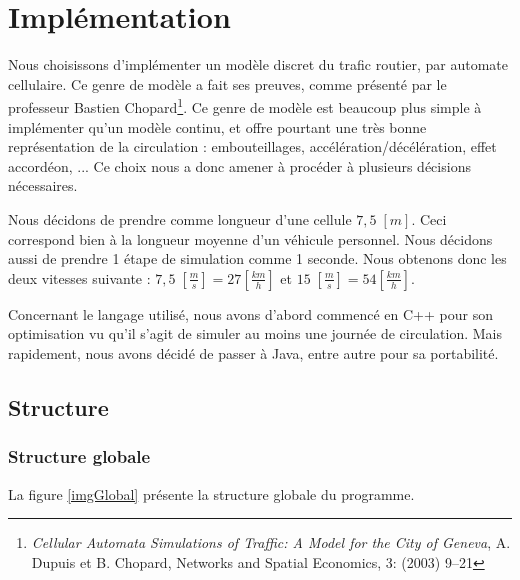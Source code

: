 \documentclass[a4paper,11pt, titlepage]{extarticle}
\begin{document}
\newpage

\section{Implémentation}

Nous choisissons d'implémenter un modèle discret du trafic routier, par automate cellulaire. Ce genre de modèle a fait ses preuves, comme présenté par le professeur Bastien Chopard\footnote{\emph{Cellular Automata Simulations of Traffic:
A Model for the City of Geneva}, A. Dupuis et B. Chopard, Networks and Spatial Economics, 3: (2003) 9–21}. Ce genre de modèle est beaucoup plus simple à implémenter qu'un modèle continu, et offre pourtant une très bonne représentation de la circulation : embouteillages, accélération/décélération, effet accordéon, ... Ce choix nous a donc amener à procéder à plusieurs décisions nécessaires.

Nous décidons de prendre comme longueur d'une cellule $7,5 \; [m]$. Ceci correspond bien à la longueur moyenne d'un véhicule personnel. Nous décidons aussi de prendre 1 étape de simulation comme 1 seconde. Nous obtenons donc les deux vitesses suivante : $7,5 \; [\frac{m}{s}] = 27 [\frac{km}{h}]$ et $15 \; [\frac{m}{s}] = 54 [\frac{km}{h}]$.

\noindent
Concernant le langage utilisé, nous avons d'abord commencé en C++ pour son optimisation vu qu'il s'agit de simuler au moins une journée de circulation. Mais rapidement, nous avons décidé de passer à Java, entre autre pour sa portabilité.

\subsection{Structure}

\subsubsection{Structure globale}

La figure \ref{imgGlobal} présente la structure globale du programme.
\end{document}
